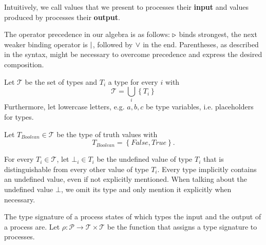 Intuitively, we call values that we present to processes their \textbf{input} and values produced by processes their \textbf{output}.

\begin{definition}
\label{def:operator_precedence}
The operator precedence in our algebra is as follows: $\triangleright$ binds strongest, the next weaker binding operator is $|$, followed by $\vee$ in the end. Parentheses, as described in the syntax, might be necessary to overcome precedence and express the desired composition.

\hfill\qedsymbol
\end{definition}

\begin{definition}
Let $\mathcal{T}$ be the set of types and $T_i$ a type for every $i$ with
\begin{equation*}
  \mathcal{T} = \bigcup_i \left\{ T_i \right\}
\end{equation*}
Furthermore, let lowercase letters, e.g. $a, b, c$ be type variables, i.e. placeholders for types.

\hfill\qedsymbol
\end{definition}

\begin{definition}
Let $T_{Boolean} \in \mathcal{T}$ be the type of truth values with
\begin{equation*}
  T_{Boolean} = \left\{False, True \right\}.
\end{equation*}

\hfill\qedsymbol
\end{definition}

\begin{definition}
For every $T_i \in \mathcal{T}$, let $\bot_i \in T_i$ be the undefined value of type $T_i$ that is distinguishable from every other value of type $T_i$. Every type implicitly contains an undefined value, even if not explicitly mentioned. When talking about the undefined value $\bot$, we omit its type and only mention it explicitly when necessary.

\hfill\qedsymbol
\end{definition}


\begin{definition}
\label{def:type_signature}
The type signature of a process states of which types the input and the output of a process are. Let $\rho \colon \mathcal{P} \to \mathcal{T} \times \mathcal{T}$ be the function that assigns a type signature to processes.

\hfill\qedsymbol
\end{definition}

